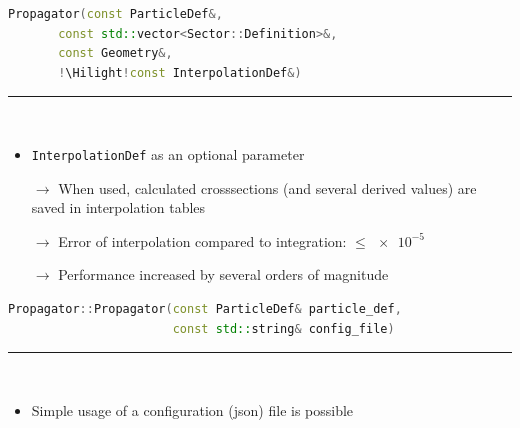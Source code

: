 \documentclass[aspectratio=1610, captions=tableheading, 11pt]{beamer}
\newcommand{\Hilight}{\makebox[0pt][l]{\color{tugreen}\rule[-4pt]{0.65\linewidth}{14pt}}}
\begin{document}
\begin{frame}[fragile]
\begin{lstlisting}[language=C++,basicstyle=\ttfamily,keywordstyle=\color{red}, escapechar=\!]
Propagator(const ParticleDef&,
	   const std::vector<Sector::Definition>&,
	   const Geometry&,
	   !\Hilight!const InterpolationDef&)
\end{lstlisting}
	\textcolor{tugreen}{\rule{\textwidth}{1pt}}\\%
    \begin{itemize}
      \setlength\itemsep{0.5em}
      \item \texttt{InterpolationDef} as an optional parameter
      \item [$\rightarrow$] When used, calculated crosssections (and several derived values) are saved in interpolation tables
      \item [$\rightarrow$] Error of interpolation compared to integration: $\leq \num{e-5}$
      \item [$\rightarrow$] Performance increased by several orders of magnitude
    \end{itemize}
\end{frame}

\begin{frame}[fragile]
\begin{lstlisting}[language=C++,basicstyle=\ttfamily,keywordstyle=\color{red}, escapechar=\!]
Propagator::Propagator(const ParticleDef& particle_def, 
                       const std::string& config_file)
\end{lstlisting}
	\textcolor{tugreen}{\rule{\textwidth}{1pt}}\\%
    \begin{itemize}
      \setlength\itemsep{0.5em}
      \item Simple usage of a configuration (json) file is possible
    \end{itemize}
\end{frame}
\end{document}
